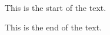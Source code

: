 \documentclass{article}
\begin{document}
This is the start of the text.

\lipsum

This is the end of the text.
\end{document}
